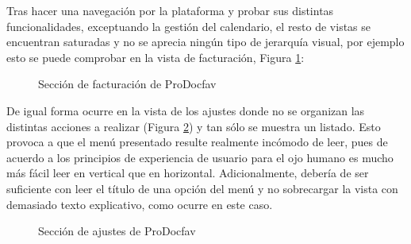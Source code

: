 Tras hacer una navegación por la plataforma y probar sus distintas funcionalidades, exceptuando la gestión del calendario, el resto de vistas se encuentran saturadas y no se aprecia ningún tipo de jerarquía visual, por ejemplo esto se puede comprobar en la vista de facturación, Figura \ref{fig:facturacion-docfav}:

\begin{figure}[H]
    \caption{Sección de facturación de ProDocfav}
    \label{fig:facturacion-docfav}
\end{figure}

De igual forma ocurre en la vista de los ajustes donde no se organizan las distintas acciones a realizar (Figura \ref{fig:ajustes-docfav}) y tan sólo se muestra un listado. Esto provoca a que el menú presentado resulte realmente incómodo de leer, pues de acuerdo a los principios de experiencia de usuario \cite{Scott2009-dh} para el ojo humano es mucho más fácil leer en vertical que en horizontal. Adicionalmente, debería de ser suficiente con leer el título de una opción del menú y no sobrecargar la vista con demasiado texto explicativo, como ocurre en este caso. 

\begin{figure}[H]
    \caption{Sección de ajustes de ProDocfav}
    \label{fig:ajustes-docfav}
\end{figure}

